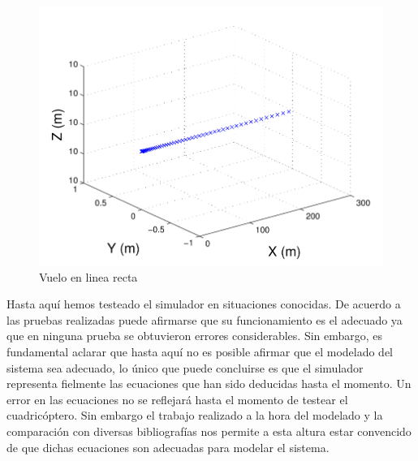 \documentclass[main]{subfiles}
\begin{document}
\begin{figure}[h!]
	\centering
	\includegraphics[width=1\textwidth]{./pics_simulador/recta.pdf}
	\caption{Vuelo en linea recta}
	\label{fig:recta}
\end{figure}

Hasta aqu\'i hemos testeado el simulador en situaciones conocidas. De acuerdo a las pruebas realizadas puede afirmarse que su funcionamiento es el adecuado ya que en ninguna prueba se obtuvieron errores considerables. Sin embargo, es fundamental aclarar que hasta aquí no es posible afirmar que el modelado del sistema sea adecuado, lo \'unico que puede concluirse es que el simulador representa fielmente las ecuaciones que han sido deducidas hasta el momento. Un error en las ecuaciones no se reflejar\'a hasta el momento de testear el cuadric\'optero. Sin embargo el trabajo realizado a la hora del modelado y la comparaci\'on con diversas bibliograf\'ias nos permite a esta altura estar convencido de que dichas ecuaciones son adecuadas para modelar el sistema.
\end{document}

